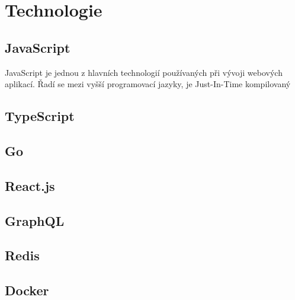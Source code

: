\section{Technologie}

\subsection{JavaScript}

JavaScript je jednou z hlavních technologií používaných při vývoji webových aplikací. Řadí se mezi vyšší programovací jazyky, je Just-In-Time kompilovaný

\subsection{TypeScript}

\subsection{Go}

\subsection{React.js}

\subsection{GraphQL}

\subsection{Redis}

\subsection{Docker}

